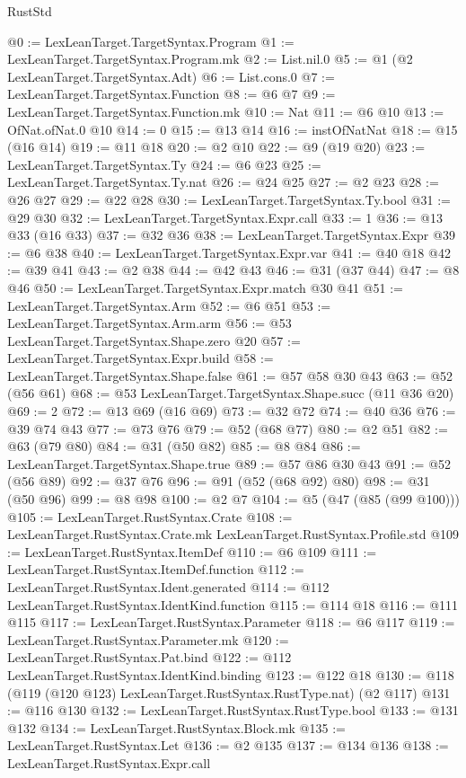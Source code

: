 \begin{lexlean}{RustStd}
\begin{coremodule}
@0 := LexLeanTarget.TargetSyntax.Program
@1 := LexLeanTarget.TargetSyntax.Program.mk
@2 := List.nil.{0}
@5 := @1 (@2 LexLeanTarget.TargetSyntax.Adt)
@6 := List.cons.{0}
@7 := LexLeanTarget.TargetSyntax.Function
@8 := @6 @7
@9 := LexLeanTarget.TargetSyntax.Function.mk
@10 := Nat
@11 := @6 @10
@13 := OfNat.ofNat.{0} @10
@14 := 0
@15 := @13 @14
@16 := instOfNatNat
@18 := @15 (@16 @14)
@19 := @11 @18
@20 := @2 @10
@22 := @9 (@19 @20)
@23 := LexLeanTarget.TargetSyntax.Ty
@24 := @6 @23
@25 := LexLeanTarget.TargetSyntax.Ty.nat
@26 := @24 @25
@27 := @2 @23
@28 := @26 @27
@29 := @22 @28
@30 := LexLeanTarget.TargetSyntax.Ty.bool
@31 := @29 @30
@32 := LexLeanTarget.TargetSyntax.Expr.call
@33 := 1
@36 := @13 @33 (@16 @33)
@37 := @32 @36
@38 := LexLeanTarget.TargetSyntax.Expr
@39 := @6 @38
@40 := LexLeanTarget.TargetSyntax.Expr.var
@41 := @40 @18
@42 := @39 @41
@43 := @2 @38
@44 := @42 @43
@46 := @31 (@37 @44)
@47 := @8 @46
@50 := LexLeanTarget.TargetSyntax.Expr.match @30 @41
@51 := LexLeanTarget.TargetSyntax.Arm
@52 := @6 @51
@53 := LexLeanTarget.TargetSyntax.Arm.arm
@56 := @53 LexLeanTarget.TargetSyntax.Shape.zero @20
@57 := LexLeanTarget.TargetSyntax.Expr.build
@58 := LexLeanTarget.TargetSyntax.Shape.false
@61 := @57 @58 @30 @43
@63 := @52 (@56 @61)
@68 := @53 LexLeanTarget.TargetSyntax.Shape.succ (@11 @36 @20)
@69 := 2
@72 := @13 @69 (@16 @69)
@73 := @32 @72
@74 := @40 @36
@76 := @39 @74 @43
@77 := @73 @76
@79 := @52 (@68 @77)
@80 := @2 @51
@82 := @63 (@79 @80)
@84 := @31 (@50 @82)
@85 := @8 @84
@86 := LexLeanTarget.TargetSyntax.Shape.true
@89 := @57 @86 @30 @43
@91 := @52 (@56 @89)
@92 := @37 @76
@96 := @91 (@52 (@68 @92) @80)
@98 := @31 (@50 @96)
@99 := @8 @98
@100 := @2 @7
@104 := @5 (@47 (@85 (@99 @100)))
@105 := LexLeanTarget.RustSyntax.Crate
@108 := LexLeanTarget.RustSyntax.Crate.mk LexLeanTarget.RustSyntax.Profile.std
@109 := LexLeanTarget.RustSyntax.ItemDef
@110 := @6 @109
@111 := LexLeanTarget.RustSyntax.ItemDef.function
@112 := LexLeanTarget.RustSyntax.Ident.generated
@114 := @112 LexLeanTarget.RustSyntax.IdentKind.function
@115 := @114 @18
@116 := @111 @115
@117 := LexLeanTarget.RustSyntax.Parameter
@118 := @6 @117
@119 := LexLeanTarget.RustSyntax.Parameter.mk
@120 := LexLeanTarget.RustSyntax.Pat.bind
@122 := @112 LexLeanTarget.RustSyntax.IdentKind.binding
@123 := @122 @18
@130 := @118 (@119 (@120 @123) LexLeanTarget.RustSyntax.RustType.nat) (@2 @117)
@131 := @116 @130
@132 := LexLeanTarget.RustSyntax.RustType.bool
@133 := @131 @132
@134 := LexLeanTarget.RustSyntax.Block.mk
@135 := LexLeanTarget.RustSyntax.Let
@136 := @2 @135
@137 := @134 @136
@138 := LexLeanTarget.RustSyntax.Expr.call

\end{coremodule}
\end{lexlean}
